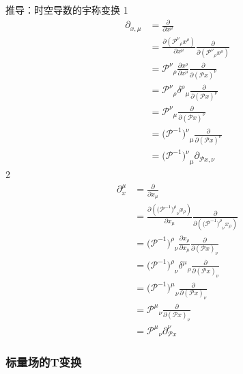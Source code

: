 推导：时空导数的宇称变换
1
\begin{equation}
    \begin{aligned}
        \partial _{x,\mu}&=\frac{\partial}{\partial x^{\mu}}
\\
&=\frac{\partial \left( {\mathcal{P} ^{\nu}}_{\rho}x^{\rho} \right)}{\partial x^{\mu}}\frac{\partial}{\partial \left( {\mathcal{P} ^{\nu}}_{\rho}x^{\rho} \right)}
\\
&={\mathcal{P} ^{\nu}}_{\rho}\frac{\partial x^{\rho}}{\partial x^{\mu}}\frac{\partial}{\partial (\mathcal{P} x)^{\nu}}
\\
&={\mathcal{P} ^{\nu}}_{\rho}{\delta ^{\rho}}_{\mu}\frac{\partial}{\partial (\mathcal{P} x)^{\nu}}
\\
&={\mathcal{P} ^{\nu}}_{\mu}\frac{\partial}{\partial (\mathcal{P} x)^{\nu}}
\\
&=(\mathcal{P} ^{-1}{)^{\nu}}_{\mu}\frac{\partial}{\partial (\mathcal{P} x)^{\nu}}
\\
&=(\mathcal{P} ^{-1}{)^{\nu}}_{\mu}\partial _{\mathcal{P} x,\nu}
    \end{aligned}
\end{equation}
2
\begin{equation}
    \begin{aligned}
        \partial _{x}^{\mu}&=\frac{\partial}{\partial x_{\mu}}
\\
&=\frac{\partial \left( (\mathcal{P} ^{-1}{)^{\rho}}_{\nu}x_{\rho} \right)}{\partial x_{\mu}}\frac{\partial}{\partial \left( (\mathcal{P} ^{-1}{)^{\rho}}_{\nu}x_{\rho} \right)}
\\
&=(\mathcal{P} ^{-1}{)^{\rho}}_{\nu}\frac{\partial x_{\rho}}{\partial x_{\mu}}\frac{\partial}{\partial (\mathcal{P} x)_{\nu}}
\\
&=(\mathcal{P} ^{-1}{)^{\rho}}_{\nu}{\delta ^{\mu}}_{\rho}\frac{\partial}{\partial (\mathcal{P} x)_{\nu}}
\\
&=(\mathcal{P} ^{-1}{)^{\mu}}_{\nu}\frac{\partial}{\partial (\mathcal{P} x)_{\nu}}
\\
&={\mathcal{P} ^{\mu}}_{\nu}\frac{\partial}{\partial (\mathcal{P} x)_{\nu}}
\\
&={\mathcal{P} ^{\mu}}_{\nu}\partial _{\mathcal{P} x}^{\nu}
    \end{aligned}
\end{equation}



\subsubsection{标量场的T变换}


